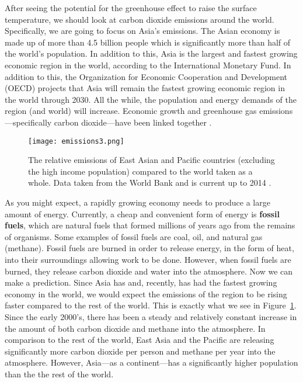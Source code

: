 After seeing the potential for the greenhouse effect to raise the surface temperature, we should look at carbon dioxide emissions around the world. Specifically, we are going to focus on Asia's emissions. The Asian economy is made up of more than 4.5 billion people which is significantly more than half of the world's population. In addition to this, Asia is the largest and fastest growing economic region in the world, according to the International Monetary Fund. In addition to this, the Organization for Economic Cooperation and Development (OECD) projects that Asia will remain the fastest growing economic region in the world through 2030. All the while, the population and energy demands of the region (and world) will increase. Economic growth and greenhouse gas emissions---specifically carbon dioxide---have been linked together \citep{saidi2015impact}.

\begin{figure}[ht!]
    \centering
    \texttt{[image: emissions3.png]}
    \caption{The relative emissions of East Asian and Pacific countries (excluding the high income population) compared to the world taken as a whole. Data taken from the World Bank and is current up to 2014 \citep{WBco2,WBmethane}.} 
    \label{fig:asia_emissions}
\end{figure}

As you might expect, a rapidly growing economy needs to produce a large amount of energy. Currently, a cheap and convenient form of energy is \textbf{fossil fuels}, which are natural fuels that formed millions of years ago from the remains of organisms. Some examples of fossil fuels are coal, oil, and natural gas (methane). Fossil fuels are burned in order to release energy, in the form of heat, into their surroundings allowing work to be done. However, when fossil fuels are burned, they release carbon dioxide and water into the atmosphere. Now we can make a prediction. Since Asia has and, recently, has had the fastest growing economy in the world, we would expect the emissions of the region to be rising faster compared to the rest of the world. This is exactly what we see in Figure~\ref{fig:asia_emissions}. Since the early 2000's, there has been a steady and relatively constant increase in the amount of both carbon dioxide and methane into the atmosphere. In comparison to the rest of the world, East Asia and the Pacific are releasing significantly more carbon dioxide per person and methane per year into the atmosphere. However, Asia---as a continent---has a significantly higher population than the the rest of the world.

